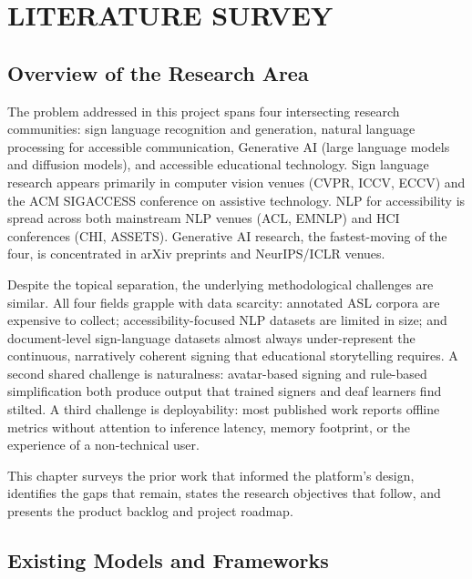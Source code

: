 \documentclass[12pt,a4paper,oneside]{report}
\begin{document}
\chapter{LITERATURE SURVEY}

\section{Overview of the Research Area}

The problem addressed in this project spans four intersecting research communities: sign language recognition and generation, natural language processing for accessible communication, Generative AI (large language models and diffusion models), and accessible educational technology. Sign language research appears primarily in computer vision venues (CVPR, ICCV, ECCV) and the ACM SIGACCESS conference on assistive technology. NLP for accessibility is spread across both mainstream NLP venues (ACL, EMNLP) and HCI conferences (CHI, ASSETS). Generative AI research, the fastest-moving of the four, is concentrated in arXiv preprints and NeurIPS/ICLR venues.

Despite the topical separation, the underlying methodological challenges are similar. All four fields grapple with data scarcity: annotated ASL corpora are expensive to collect; accessibility-focused NLP datasets are limited in size; and document-level sign-language datasets almost always under-represent the continuous, narratively coherent signing that educational storytelling requires. A second shared challenge is naturalness: avatar-based signing and rule-based simplification both produce output that trained signers and deaf learners find stilted. A third challenge is deployability: most published work reports offline metrics without attention to inference latency, memory footprint, or the experience of a non-technical user.

This chapter surveys the prior work that informed the platform's design, identifies the gaps that remain, states the research objectives that follow, and presents the product backlog and project roadmap.

\section{Existing Models and Frameworks}
\end{document}
